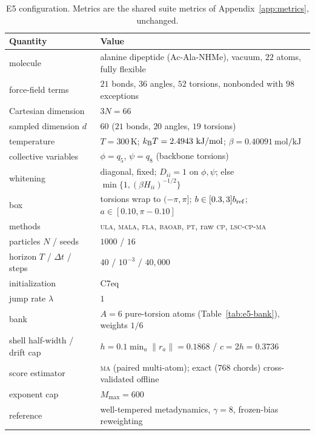 \documentclass[11pt]{article}
\begin{document}
\begin{table}[!ht]
\centering
\small
\setlength{\tabcolsep}{6pt}
\begin{tabular}{ll}
\toprule
Quantity & Value\\
\midrule
molecule                       & alanine dipeptide (Ac-Ala-NHMe), vacuum, $22$ atoms, fully flexible\\
force-field terms              & $21$ bonds, $36$ angles, $52$ torsions, nonbonded with $98$ exceptions\\
Cartesian dimension            & $3N=66$\\
sampled dimension $d$          & $60$ ($21$ bonds, $20$ angles, $19$ torsions)\\
temperature                    & $T=300\,$K; $k_{\rm B}T=2.4943\ \mathrm{kJ/mol}$; $\beta=0.40091\ \mathrm{mol/kJ}$\\
collective variables           & $\phi=q_5$, $\psi=q_8$ (backbone torsions)\\
whitening                      & diagonal, fixed; $D_{ii}=1$ on $\phi,\psi$; else $\min\{1,(\beta H_{ii})^{-1/2}\}$\\
box                            & torsions wrap to $(-\pi,\pi]$; $b\in[0.3,3]b_{\rm ref}$;
                                 $a\in[0.10,\pi-0.10]$\\
methods                        & \textsc{ula}, \textsc{mala}, \textsc{fla}, \textsc{baoab},
                                 \textsc{pt}, raw \textsc{cp}, \textsc{lsc-cp-ma}\\
particles $N$ / seeds          & $1000$ / $16$\\
horizon $T$ / $\Delta t$ / steps & $40$ / $10^{-3}$ / $40{,}000$\\
initialization                 & C7eq\\
jump rate $\lambda$            & $1$\\
bank                           & $A=6$ pure-torsion atoms (Table~\ref{tab:e5-bank}), weights $1/6$\\
shell half-width / drift cap   & $h=0.1\min_a\lVert r_a\rVert=0.1868$ / $c=2h=0.3736$\\
score estimator                & \textsc{ma} (paired multi-atom); exact
                                 ($768$ chords) cross-validated offline\\
exponent cap                   & $M_{\max}=600$\\
reference                      & well-tempered metadynamics, $\gamma=8$, frozen-bias reweighting\\
\bottomrule
\end{tabular}
\caption{E5 configuration.  Metrics are the shared suite metrics of
Appendix~\ref{app:metrics}, unchanged.}
\label{tab:e5-config}
\end{table}
\end{document}

